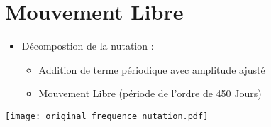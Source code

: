 \section{Mouvement Libre}
\begin{frame}
  \begin{itemize}
    \item Décompostion de la nutation :
      \begin{itemize}
        \item Addition de terme périodique avec amplitude ajusté
        \item Mouvement Libre (période de l'ordre de 450 Jours)
      \end{itemize}
  \end{itemize} 

  \texttt{[image: original\_frequence\_nutation.pdf]}
\end{frame}

